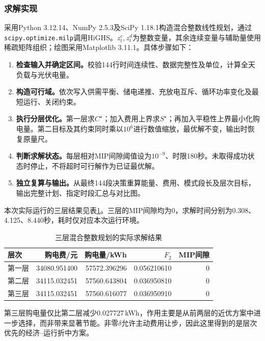 \documentclass[withoutpreface,bwprint]{cumcmthesis}
\begin{document}
\subsubsection{求解实现}
采用Python 3.12.14、NumPy 2.5.3及SciPy 1.18.1构造混合整数线性规划，通过\texttt{scipy.optimize.milp}调用HiGHS。$z_t^c,z_t^d$为整数变量，其余连续变量与辅助量使用稀疏矩阵组织；绘图采用Matplotlib 3.11.1。具体步骤如下：
\begin{enumerate}[label=\textbf{步骤\arabic*：},leftmargin=4.8em,itemsep=4pt]
 \item \textbf{检查输入并确定区间。}校验144行时间连续性、数据完整性及单位，计算全天负载与光伏电量。
 \item \textbf{构造可行域。}依次写入供需平衡、储电递推、充放电互斥、循环功率变化及最短运行、关闭约束。
 \item \textbf{执行分层优化。}第一层求$C^\star$；加入费用上界求$S^\star$；再加入平稳性上界最小化购电量。第二目标及其约束同时乘以$10^6$进行数值缩放，最优解不变，输出时恢复原量尺。
 \item \textbf{判断求解状态。}每层相对MIP间隙阈值设为$10^{-9}$、时限180秒。未取得成功状态时停止，不将超时可行解作为已证最优解。
 \item \textbf{独立复算与输出。}从最终144段决策重算能量、费用、模式段长及层次目标，输出完整计划、指定时段汇总与对比图。
\end{enumerate}
本次实际运行的三层结果见表\ref{tab:q1-stages}。三层的MIP间隙均为0，求解时间分别为0.308、4.125、8.440秒，耗时仅对应本次运行环境。
\begin{table}[htbp]
 \centering\small
 \caption{三层混合整数规划的实际求解结果}\label{tab:q1-stages}
 \begin{tabular}{lrrrr}
 \toprule
 层次&购电费/元&购电量/kWh&$F_2$&MIP间隙\\
 \midrule
 第一层&34080.951400&57572.396296&0.056210610&0\\
 第二层&34115.032451&57560.643804&0.036950810&0\\
 第三层&34115.032451&57560.616077&0.036950910&0\\
 \bottomrule
 \end{tabular}
\end{table}
第三层购电量仅比第二层减少0.027727\,kWh，作用主要是从前两层的近优方案中进一步选择，而非带来显著节能。非零$\delta$允许主动费用让步，因此这里得到的是层次优先的经济--运行折中方案。
\end{document}

